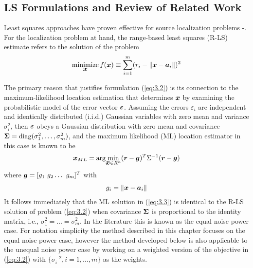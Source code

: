 \subsection{LS Formulations and Review of Related Work} %

Least squares approaches have proven effective for source localization problems \cite{SmithAbel} -\cite{BeckStLi}. For the localization problem at hand, the range-based least squares (R-LS) estimate refers to the solution of the problem
\begin{equation}\label{eq:3.2} %
\Min_{\Bx} f(\Bx) \equiv \sum_{i=1}^{m} (r_i - \|{\Bx} - {\Ba}_i\|)^2
\end{equation}

The primary reason that justifies formulation (\ref{eq:3.2}) is its connection to the maximum-likelihood location estimation that determines $\mbox{\boldmath$x$}$ by examining the probabilistic model of the error vector $\mbox{\boldmath${\varepsilon}$}$. Assuming the errors $\varepsilon_i$ are independent and identically distributed (i.i.d.) Gaussian variables with zero mean and variance $\sigma_i^2$, then $\mbox{\boldmath${\varepsilon}$}$ obeys a Gaussian distribution with zero mean and covariance $\mbox{\boldmath${\Sigma}$} = \mbox{diag}(\sigma_1^2, \ldots, \sigma_m^2)$, and the maximum likelihood (ML) location estimator in this case is known to be
\begin{equation} \label{eq:3.3}%
\Bx_{ML} = \mbox{arg}\!\min_{{\Bx} \in R^n} (\Br - \Bg)^T\Sigma^{-1}(\Br - \Bg)
\end{equation}
where $\mbox{\boldmath$g$} = [g_1 \ g_2 \ldots \ g_m]^T$ with
\begin{equation} \label{eq:3.4}%
g_i = \|{\Bx} - {\Ba}_i\|
\end{equation}
It follows immediately that the ML solution in (\ref{eq:3.3}) is identical to the R-LS solution of problem (\ref{eq:3.2}) when covariance $\mbox{\boldmath${\Sigma}$}$ is proportional to the identity matrix, i.e., $\sigma_1^2=\ldots =\sigma_m^2$. In the literature this is known as the equal noise power case. For notation simplicity the method described in this chapter focuses on the equal noise power case, however the method developed below is also applicable to the unequal noise power case by working on a weighted version of the objective in  (\ref{eq:3.2})  with $\{\sigma_i^{-2}, i = 1, \ldots, m\}$ as the weights.

